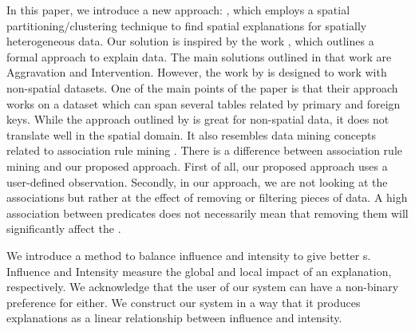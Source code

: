
In this paper, we introduce a new approach: {\solution}, which employs a spatial partitioning/clustering technique to find spatial explanations for spatially heterogeneous data. Our solution is inspired by the work \cite{roy2014formal}, which outlines a formal approach to explain data. The main solutions outlined in that work are Aggravation and Intervention. However, the work by \cite{roy2014formal} is designed to work with non-spatial datasets. One of the main points of the paper is that their approach works on a dataset which can span several tables related by primary and foreign keys. While the approach outlined by \cite{roy2014formal} is great for non-spatial data, it does not translate well in the spatial domain. 
It also resembles data mining concepts related to association rule mining \cite{agarwal1994fast,tan2006introduction}. 
There is a difference between association rule mining and our proposed approach. First of all, our proposed approach uses a user-defined observation. Secondly, in our approach, we are not looking at the associations but rather at the effect of removing or filtering pieces of data. A high association between predicates does not necessarily mean that removing them will significantly affect the {\fact}.


We introduce a method to balance influence and intensity to give better {\explanation}s. Influence and Intensity measure the global and local impact of an explanation, respectively. We acknowledge that the user of our system can have a non-binary preference for either. We construct our system in a way that it produces explanations as a linear relationship between influence and intensity.



